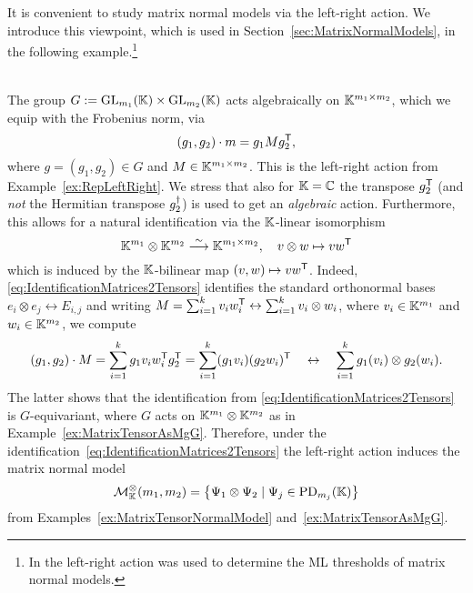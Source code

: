 It is convenient to study matrix normal models via the left-right action. We introduce this viewpoint, which is used in Section~\ref{sec:MatrixNormalModels}, in the following example.\footnote{In \cite{DM21MatrixNormal} the left-right action was used to determine the ML thresholds of matrix normal models.}

\begin{example}\label{ex:LeftRightMatrixNormal}
	\ \\
	The group $G := \operatorname{GL}_{m_1}(\mathbb K) \times \operatorname{GL}_{m_2}(\mathbb K)$ acts algebraically on $\mathbb K^{m_1 \times m_2}$, which we equip with the Frobenius norm, via
		\begin{equation}\label{eq:LeftRightMatrixNormal}
			(g_1, g_2) \cdot m = g_1 M g_2^{\mathsf{T}},
		\end{equation}
	where $g = (g_1,g_2) \in G$ and $M \in \mathbb K^{m_1 \times m_2}$. This is the left-right action from Example~\ref{ex:RepLeftRight}. We stress that also for $\mathbb K = \mathbb C$ the transpose $g_2^{\mathsf{T}}$ (and \emph{not} the Hermitian transpose $g_2^{\dagger}$) is used to get an \emph{algebraic} action. Furthermore, this allows for a natural identification via the $\mathbb K$-linear isomorphism
		\begin{equation}\label{eq:IdentificationMatrices2Tensors}
			\mathbb K^{m_1} \otimes \mathbb K^{m_2} \overset{\sim}{\longrightarrow} \mathbb K^{m_1 \times m_2}, \quad v \otimes w \mapsto v w^{\mathsf{T}}
		\end{equation}
	which is induced by the $\mathbb K$-bilinear map $(v,w) \mapsto v w^{\mathsf{T}}$. Indeed, \eqref{eq:IdentificationMatrices2Tensors} identifies the standard orthonormal bases $e_i \otimes e_j \leftrightarrow E_{i,j}$
	and writing $M = \sum_{i=1}^k v_i w_i^{\mathsf{T}} \leftrightarrow \sum_{i=1}^k v_i \otimes w_i$, where $v_i \in \mathbb K^{m_1}$ and $w_i \in \mathbb K^{m_2}$, we compute
		\begin{align*}
			(g_1, g_2) \cdot M = \sum_{i=1}^k g_1 v_i w_i^{\mathsf{T}} g_2^{\mathsf{T}} = \sum_{i=1}^k (g_1 v_i) (g_2 w_i)^{\mathsf{T}}
			\quad \leftrightarrow \quad \sum_{i=1}^k g_1(v_i) \otimes g_2(w_i).
		\end{align*}
	The latter shows that the identification from \eqref{eq:IdentificationMatrices2Tensors} is $G$-equivariant, where $G$ acts on $\mathbb K^{m_1} \otimes \mathbb K^{m_2}$ as in Example~\ref{ex:MatrixTensorAsMgG}. Therefore, under the identification~\eqref{eq:IdentificationMatrices2Tensors} the left-right action induces the matrix normal model
		\[ \mathcal{M}^{\otimes}_{\mathbb{K}}(m_1,m_2) = \big\{ \Psi_1 \otimes \Psi_2 \mid \Psi_j \in \operatorname{PD}_{m_j}(\mathbb K) \big\} \]
	from Examples~\ref{ex:MatrixTensorNormalModel} and~\ref{ex:MatrixTensorAsMgG}.
	

\end{example}

